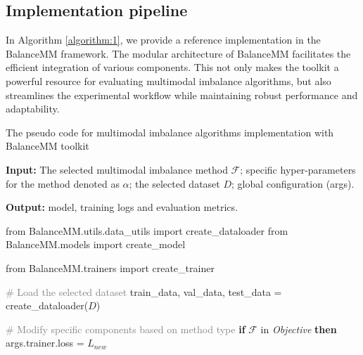 \subsection{Implementation pipeline} \label{sec:tool5}
In Algorithm \ref{algorithm:1}, we provide a reference implementation in the BalanceMM framework. The modular architecture of BalanceMM facilitates the efficient integration of various components. This not only makes the toolkit a powerful resource for evaluating multimodal imbalance algorithms, but also streamlines the experimental workflow while maintaining robust performance and adaptability.
\begin{algorithm}[t] 
\caption{The pseudo code for multimodal imbalance algorithms implementation with BalanceMM toolkit}
\begin{algorithmic} \label{algorithm:1}
\setlength{\leftskip}{0pt} %
\raggedright

\STATE \hspace*{-1em}\textbf{Input:} The selected multimodal imbalance method $\mathcal{F}$; 
\STATE \hspace*{-1em}specific hyper-parameters for the method denoted as $\alpha$;
\STATE \hspace*{-1em}the selected dataset $D$; global configuration (args).

\STATE \hspace*{-1em}\textbf{Output:} model, training logs and evaluation metrics.

\STATE \hspace*{-1em}from BalanceMM.utils.data\_utils import create\_dataloader
\STATE \hspace*{-1em}from BalanceMM.models import create\_model

\STATE \hspace*{-1em}from BalanceMM.trainers import create\_trainer

\STATE \hspace*{-1em}\textcolor{gray}{\# Load the selected dataset}
\STATE \hspace*{-1em}train\_data, val\_data, test\_data = create\_dataloader($D$)

\STATE \hspace*{-1em}\textcolor{gray}{\# Modify specific components based on method type}
\STATE \hspace*{-1em}\textbf{if} $\mathcal{F}$ in \textit{Objective} \textbf{then}
\STATE \hspace*{0em}args.trainer.loss = $L_{new}$


\end{algorithmic}
\end{algorithm}
